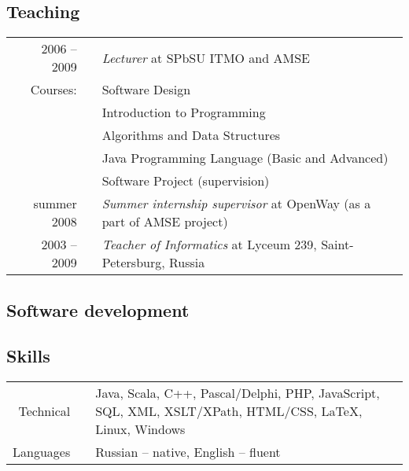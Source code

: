 \documentclass[a4paper, 12pt]{article}
\begin{document}
\subsection*{Teaching}
\begin{tabular}{ r l p{370pt} }
	2006 -- 2009 && {\it Lecturer} at SPbSU ITMO and AMSE\\%
	Courses: && Software Design\\
		 && Introduction to Programming\\
		 && Algorithms and Data Structures\\
		 && Java Programming Language (Basic and Advanced)\\
		 && Software Project (supervision)\\
	summer 2008 && {\it Summer internship supervisor} at OpenWay (as a part of AMSE project)\\%
	2003 -- 2009 && {\it Teacher of Informatics} at Lyceum 239, Saint-Petersburg, Russia\\%
\end{tabular}

\subsection*{Software development}

\subsection*{Skills}

\begin{tabular}{ r l p{350pt} }
Technical&&Java, Scala, C++, Pascal/Delphi, PHP, JavaScript, SQL, XML, XSLT/XPath, HTML/CSS, \LaTeX, Linux, Windows\\
Languages&&Russian -- native, English -- fluent\\
\end{tabular}
\end{document}
